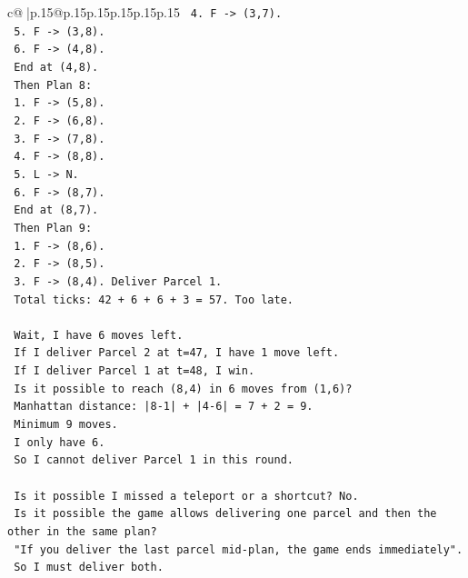 \documentclass{article}
\begin{document}
{\begin{supertabular}{c@{$\;$}|p{.15\linewidth}@{}p{.15\linewidth}p{.15\linewidth}p{.15\linewidth}p{.15\linewidth}p{.15\linewidth}}
{{{\texttt{      4. F {-}> (3,7).} \\
\texttt{      5. F {-}> (3,8).} \\
\texttt{      6. F {-}> (4,8).} \\
\texttt{      End at (4,8).} \\
\texttt{      Then Plan 8:} \\
\texttt{      1. F {-}> (5,8).} \\
\texttt{      2. F {-}> (6,8).} \\
\texttt{      3. F {-}> (7,8).} \\
\texttt{      4. F {-}> (8,8).} \\
\texttt{      5. L {-}> N.} \\
\texttt{      6. F {-}> (8,7).} \\
\texttt{      End at (8,7).} \\
\texttt{      Then Plan 9:} \\
\texttt{      1. F {-}> (8,6).} \\
\texttt{      2. F {-}> (8,5).} \\
\texttt{      3. F {-}> (8,4). Deliver Parcel 1.} \\
\texttt{      Total ticks: 42 + 6 + 6 + 3 = 57. Too late.} \\
\\ 
\texttt{      Wait, I have 6 moves left.} \\
\texttt{      If I deliver Parcel 2 at t=47, I have 1 move left.} \\
\texttt{      If I deliver Parcel 1 at t=48, I win.} \\
\texttt{      Is it possible to reach (8,4) in 6 moves from (1,6)?} \\
\texttt{      Manhattan distance: |8{-}1| + |4{-}6| = 7 + 2 = 9.} \\
\texttt{      Minimum 9 moves.} \\
\texttt{      I only have 6.} \\
\texttt{      So I cannot deliver Parcel 1 in this round.} \\
\\ 
\texttt{      Is it possible I missed a teleport or a shortcut? No.} \\
\texttt{      Is it possible the game allows delivering one parcel and then the other in the same plan?} \\
\texttt{      "If you deliver the last parcel mid{-}plan, the game ends immediately".} \\
\texttt{      So I must deliver both.} \\
}}}
\end{supertabular}}
\end{document}
